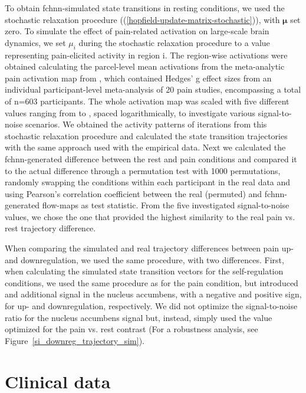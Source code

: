 \documentclass{article}
\begin{document}
To obtain \acrshort{fchnn}-simulated state transitions in resting conditions, we used the stochastic relaxation procedure ((\ref{hopfield-update-matrix-stochastic})), with $\mathbf{\mu}$ set zero.
To simulate the effect of pain-related activation on large-scale brain dynamics, we set $\mu_i$ during the stochastic relaxation procedure to a value representing pain-elicited activity in region i. The region-wise activations were obtained calculating the parcel-level mean activations from the meta-analytic pain activation map from \citep{zunhammer2021meta}, which contained Hedges' g effect sizes from an individual participant-level meta-analysis of 20 pain studies, encompassing a total of n=603 participants. The whole activation map was scaled with five different values ranging from  to , spaced logarithmically, to investigate various signal-to-noise scenarios.
We obtained the activity patterns of  iterations from this stochastic relaxation procedure and calculated the state transition trajectories with the same approach used with the empirical data.
Next we calculated the \acrshort{fchnn}-generated difference between the rest and pain conditions and compared it to the actual difference through a permutation test with 1000 permutations, randomly swapping the conditions within each participant in the real data and using Pearson's correlation coefficient between the real (permuted) and \acrshort{fchnn}-generated flow-maps as test statistic.
From the five investigated signal-to-noise values, we chose the one that provided the highest similarity to the real pain vs. rest trajectory difference.

When comparing the simulated and real trajectory differences between pain up- and downregulation, we used the same procedure, with two differences. First, when calculating the simulated state transition vectors for the self-regulation conditions, we used the same procedure as for the pain condition, but introduced and additional signal in the nucleus accumbens, with a negative and positive sign, for  up- and downregulation, respectively. We did not optimize the signal-to-noise ratio for the nucleus accumbens signal but, instead, simply used the value optimized for the pain vs. rest contrast (For a robustness analysis, see Figure~\ref{si_downreg_trajectory_sim}).

\section{Clinical data}
\end{document}
